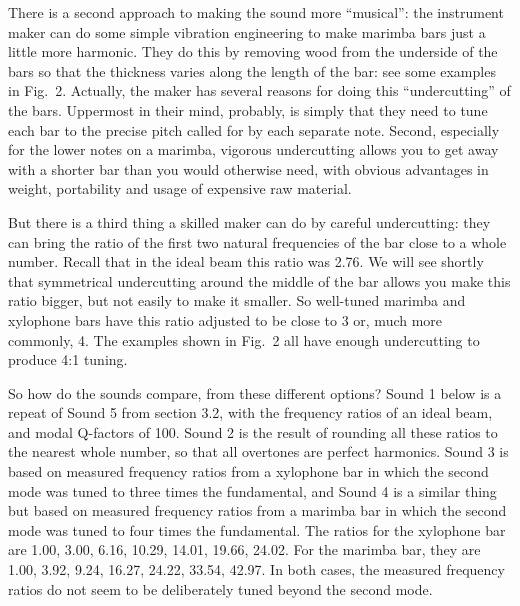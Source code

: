   There is a second approach to making the sound more ``musical'': the 
  instrument maker can do some simple vibration engineering to make marimba 
  bars just a little more harmonic. They do this by removing wood from the 
  underside of the bars so that the thickness varies along the length of the 
  bar: see some examples in Fig.\ 2. Actually, the maker has several reasons 
  for doing this ``undercutting'' of the bars. Uppermost in their mind, 
  probably, is simply that they need to tune each bar to the precise pitch 
  called for by each separate note. Second, especially for the lower notes on a 
  marimba, vigorous undercutting allows you to get away with a shorter bar than 
  you would otherwise need, with obvious advantages in weight, portability and 
  usage of expensive raw material. 


  But there is a third thing a skilled maker can do by careful undercutting: 
  they can bring the ratio of the first two natural frequencies of the bar 
  close to a whole number. Recall that in the ideal beam this ratio was 2.76. 
  We will see shortly that symmetrical undercutting around the middle of the 
  bar allows you make this ratio bigger, but not easily to make it smaller. So 
  well-tuned marimba and xylophone bars have this ratio adjusted to be close to 
  3 or, much more commonly, 4. The examples shown in Fig.\ 2 all have enough 
  undercutting to produce 4:1 tuning. 

  So how do the sounds compare, from these different options? Sound 1 below is 
  a repeat of Sound 5 from section 3.2, with the frequency ratios of an ideal 
  beam, and modal Q-factors of 100. Sound 2 is the result of rounding all these 
  ratios to the nearest whole number, so that all overtones are perfect 
  harmonics. Sound 3 is based on measured frequency ratios from a xylophone bar 
  in which the second mode was tuned to three times the fundamental, and Sound 
  4 is a similar thing but based on measured frequency ratios from a marimba 
  bar in which the second mode was tuned to four times the fundamental. The 
  ratios for the xylophone bar are 1.00, 3.00, 6.16, 10.29, 14.01, 19.66, 
  24.02. For the marimba bar, they are 1.00, 3.92, 9.24, 16.27, 24.22, 33.54, 
  42.97. In both cases, the measured frequency ratios do not seem to be 
  deliberately tuned beyond the second mode. 

